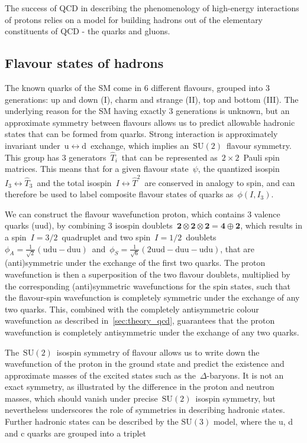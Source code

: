 The success of QCD in describing the phenomenology of high-energy interactions of protons relies on a model for building hadrons out of the elementary constituents of QCD - the quarks and gluons.

\subsection{Flavour states of hadrons}
The known quarks of the SM come in 6 different flavours, grouped into 3 generations: up and down (I), charm and strange (II), top and bottom (III). The underlying reason for the SM having exactly 3 generations is unknown, but an approximate symmetry between flavours allows us to predict allowable hadronic states that can be formed from quarks. Strong interaction is approximately invariant under~$\mathrm{u} \leftrightarrow \mathrm{d}$~exchange, which implies an~$\mathrm{SU}(2)$~flavour symmetry. This group has 3 generators~$\hat{T}_i$~that can be represented as~$2\times2$~Pauli spin matrices. This means that for a given flavour state~$\psi$, the quantized isospin~$I_3 \leftrightarrow \hat{T}_3$~and the total isospin~$I \leftrightarrow \hat{T}^2$~are conserved in analogy to spin, and can therefore be used to label composite flavour states of quarks as~$\phi(I, I_3)$.

We can construct the flavour wavefunction proton, which contains 3 valence quarks (uud), by combining 3 isospin doublets~$\mathbf{2} \otimes \mathbf{2} \otimes \mathbf{2} = \mathbf{4} \oplus \mathbf{2}$, which results in a spin~$I=3/2$~quadruplet and two spin~$I=1/2$~doublets~$\phi_A=\frac{1}{\sqrt{2}}(\mathrm{udu} - \mathrm{duu})$~and~$\phi_S = \frac{1}{\sqrt{6}}(2 \mathrm{uud} - \mathrm{duu} - \mathrm{udu})$, that are (anti)symmetric under the exchange of the first two quarks. The proton wavefunction is then a superposition of the two flavour doublets, multiplied by the corresponding (anti)symmetric wavefunctions for the spin states, such that the flavour-spin wavefunction is completely symmetric under the exchange of any two quarks. This, combined with the completely antisymmetric colour wavefunction as described in~\cref{sec:theory_qcd}, guarantees that the proton wavefunction is completely antisymmetric under the exchange of any two quarks.

The~$\mathrm{SU}(2)$~isospin symmetry of flavour allows us to write down the wavefunction of the proton in the ground state and predict the existence and approximate masses of the excited states such as the~$\Delta$-baryons. It is not an exact symmetry, as illustrated by the difference in the proton and neutron masses, which should vanish under precise~$\mathrm{SU}(2)$~isospin symmetry, but nevertheless underscores the role of symmetries in describing hadronic states. Further hadronic states can be described by the $\mathrm{SU}(3)$ model, where the u, d and c quarks are grouped into a triplet

